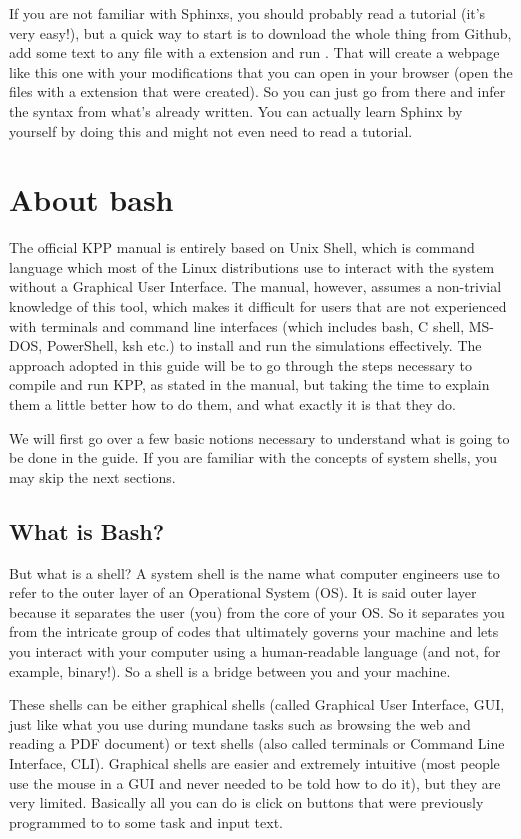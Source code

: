 \documentclass[letterpaper,10pt,openany,oneside]{sphinxmanual}
\begin{document}
If you are not familiar with Sphinxs, you should probably read a tutorial (it's
very easy!), but a quick way to start is to download the whole thing from
Github, add some text to any file with a  extension and run . That will create a webpage like this one with your modifications that
you can open in your browser (open the files with a  extension that
were created). So you can just go from there and infer the syntax from what's
already written. You can actually learn Sphinx by yourself by doing this and
might not even need to read a tutorial.


\chapter{About bash}
\label{bash:about-bash}\label{bash::doc}
The official KPP manual is entirely based on Unix Shell, which is command
language which most of the Linux distributions use to interact with the system
without a Graphical User Interface. The manual, however, assumes a non-trivial
knowledge of this tool, which makes it difficult for users that are not
experienced with terminals and command line interfaces (which includes bash, C
shell, MS-DOS, PowerShell, ksh etc.) to install and run the simulations
effectively. The approach adopted in this guide will be to go through the steps
necessary to compile and run KPP, as stated in the manual, but taking the time
to explain them a little better how to do them, and what exactly it is that
they do.

We will first go over a few basic notions necessary to understand what is going
to be done in the guide. If you are familiar with the concepts of system shells,
you may skip the next sections.


\section{What is Bash?}
\label{bash:what-is-bash}
But what is a shell? A system shell is the name what computer engineers use to
refer to the outer layer of an Operational System (OS). It is said outer layer
because it separates the user (you) from the core of your OS. So it separates
you from the intricate group of codes that ultimately governs your machine and
lets you interact with your computer using a human-readable language (and not,
for example, binary!). So a shell is a bridge between you and your machine.

These shells can be either graphical shells (called Graphical User Interface,
GUI, just like what you use during mundane tasks such as browsing the web and
reading a PDF document) or text shells (also called terminals or Command Line
Interface, CLI). Graphical shells are easier and extremely intuitive (most
people use the mouse in a GUI and never needed to be told how to do it), but
they are very limited. Basically all you can do is click on buttons that were
previously programmed to to some task and input text.
\end{document}
